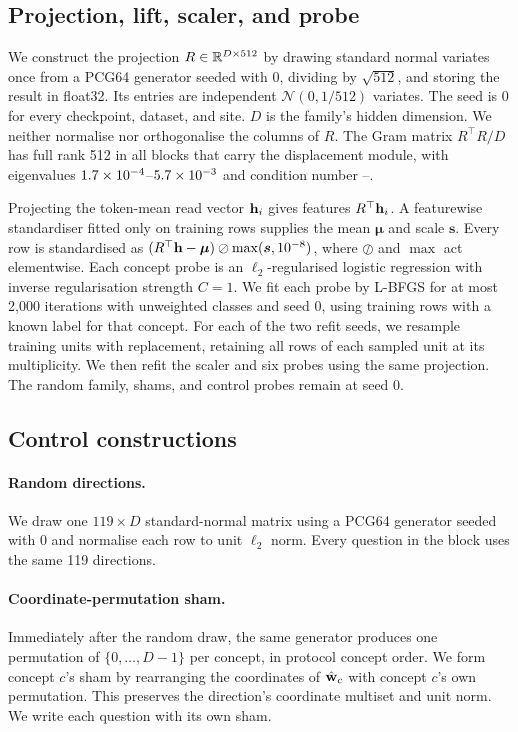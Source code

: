 \subsection{Projection, lift, scaler, and probe}
\label{app:repro-probe}

We construct the projection $R\in\mathbb{R}^{D\times512}$ by drawing standard normal variates once from a PCG64 generator seeded with $0$, dividing by $\sqrt{512}$, and storing the result in float32. Its entries are independent $\mathcal{N}(0,1/512)$ variates. The seed is $0$ for every checkpoint, dataset, and site. $D$ is the family's hidden dimension. We neither normalise nor orthogonalise the columns of $R$. The Gram matrix $R^{\top}R/D$ has full rank 512 in all \cfAltdirdBlocks{} blocks that carry the displacement module, with eigenvalues $1.7\times10^{-4}$--$5.7\times10^{-3}$ and condition number \cfAltdirdCondMin{}--\cfAltdirdCondMax{}.

Projecting the token-mean read vector $\mathbf{h}_i$ gives features $R^{\top}\mathbf{h}_i$. A featurewise standardiser fitted only on training rows supplies the mean $\boldsymbol\mu$ and scale $\boldsymbol s$. Every row is standardised as $(R^{\top}\mathbf{h}-\boldsymbol\mu)\oslash\max(\boldsymbol s,10^{-8})$, where $\oslash$ and $\max$ act elementwise. Each concept probe is an $\ell_2$-regularised logistic regression with inverse regularisation strength $C=1$. We fit each probe by L-BFGS for at most 2{,}000 iterations with unweighted classes and seed $0$, using training rows with a known label for that concept. For each of the two refit seeds, we resample training units with replacement, retaining all rows of each sampled unit at its multiplicity. We then refit the scaler and six probes using the same projection. The random family, shams, and control probes remain at seed 0.

\subsection{Control constructions}
\label{app:repro-controls}

\paragraph{Random directions.} We draw one $119\times D$ standard-normal matrix using a PCG64 generator seeded with $0$ and normalise each row to unit $\ell_2$ norm. Every question in the block uses the same 119 directions.

\paragraph{Coordinate-permutation sham.} Immediately after the random draw, the same generator produces one permutation of $\{0,\dots,D{-}1\}$ per concept, in protocol concept order. We form concept $c$'s sham by rearranging the coordinates of $\hat{\mathbf{w}}_c$ with concept $c$'s own permutation. This preserves the direction's coordinate multiset and unit norm. We write each question with its own sham.

